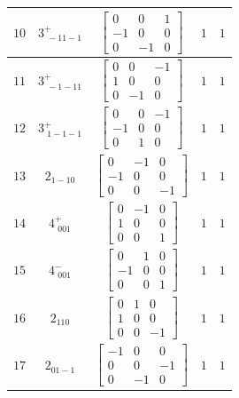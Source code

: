 \documentclass[fleqn,8pt]{jsarticle}
\begin{document}
\begin{longtable}{ccccc}
$ 10 $ & $ 3^{+}_{\,\,-11-1} $ & $ \begin{bmatrix} 0 & 0 & 1 \\ -1 & 0 & 0 \\ 0 & -1 & 0 \end{bmatrix} $ & $ 1 $ & $ 1 $ \\ \hline
$ 11 $ & $ 3^{+}_{\,\,-1-11} $ & $ \begin{bmatrix} 0 & 0 & -1 \\ 1 & 0 & 0 \\ 0 & -1 & 0 \end{bmatrix} $ & $ 1 $ & $ 1 $ \\ \hline
$ 12 $ & $ 3^{+}_{\,\,1-1-1} $ & $ \begin{bmatrix} 0 & 0 & -1 \\ -1 & 0 & 0 \\ 0 & 1 & 0 \end{bmatrix} $ & $ 1 $ & $ 1 $ \\ \hline
$ 13 $ & $ 2{}_{1-10} $ & $ \begin{bmatrix} 0 & -1 & 0 \\ -1 & 0 & 0 \\ 0 & 0 & -1 \end{bmatrix} $ & $ 1 $ & $ 1 $ \\ \hline
$ 14 $ & $ 4^{+}_{\,\,001} $ & $ \begin{bmatrix} 0 & -1 & 0 \\ 1 & 0 & 0 \\ 0 & 0 & 1 \end{bmatrix} $ & $ 1 $ & $ 1 $ \\ \hline
$ 15 $ & $ 4^{-}_{\,\,001} $ & $ \begin{bmatrix} 0 & 1 & 0 \\ -1 & 0 & 0 \\ 0 & 0 & 1 \end{bmatrix} $ & $ 1 $ & $ 1 $ \\ \hline
$ 16 $ & $ 2{}_{110} $ & $ \begin{bmatrix} 0 & 1 & 0 \\ 1 & 0 & 0 \\ 0 & 0 & -1 \end{bmatrix} $ & $ 1 $ & $ 1 $ \\ \hline
$ 17 $ & $ 2{}_{01-1} $ & $ \begin{bmatrix} -1 & 0 & 0 \\ 0 & 0 & -1 \\ 0 & -1 & 0 \end{bmatrix} $ & $ 1 $ & $ 1 $ \\ \hline

\end{longtable}
\end{document}
